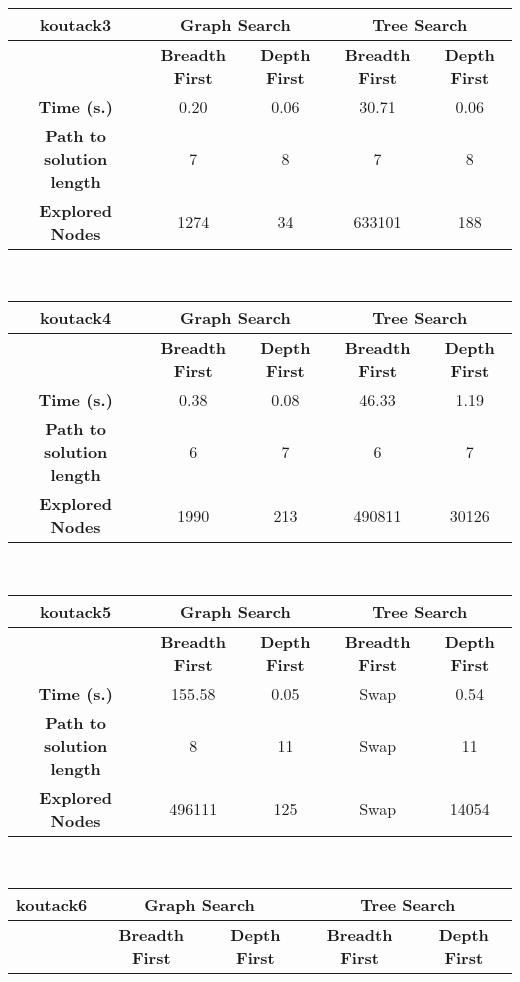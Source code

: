 \begin{description}
\begin{tabular}{|c|c|c|c|c|}
\hline 
\end{tabular}\\
\begin{tabular}{|c|c|c|c|c|} 
\hline \textbf{koutack3} & \multicolumn{2}{|c|}{\textbf{Graph Search}} & \multicolumn{2}{|c|}{\textbf{Tree Search}} \\ \hline & \textbf{Breadth First} &  \textbf{Depth First} & \textbf{Breadth First} &  \textbf{Depth First}\\ 
\hline \textbf{Time (s.)} & 0.20 & 0.06 & 30.71 & 0.06\\ \textbf{Path to solution length} & 7 & 8 & 7 & 8 \\ \textbf{Explored Nodes} & 1274 & 34 & 633101 & 188\\ 
\hline 
\end{tabular}\\
\begin{tabular}{|c|c|c|c|c|} 
\hline \textbf{koutack4} & \multicolumn{2}{|c|}{\textbf{Graph Search}} & \multicolumn{2}{|c|}{\textbf{Tree Search}} \\ \hline & \textbf{Breadth First} &  \textbf{Depth First} & \textbf{Breadth First} &  \textbf{Depth First}\\ 
\hline \textbf{Time (s.)} & 0.38 & 0.08 & 46.33 & 1.19\\ \textbf{Path to solution length} & 6 & 7 & 6 & 7 \\ \textbf{Explored Nodes} & 1990 & 213 & 490811 & 30126\\ 
\hline 
\end{tabular}\\
\begin{tabular}{|c|c|c|c|c|} 
\hline \textbf{koutack5} & \multicolumn{2}{|c|}{\textbf{Graph Search}} & \multicolumn{2}{|c|}{\textbf{Tree Search}} \\ \hline & \textbf{Breadth First} &  \textbf{Depth First} & \textbf{Breadth First} &  \textbf{Depth First}\\ 
\hline \textbf{Time (s.)} & 155.58 & 0.05  & Swap & 0.54\\ \textbf{Path to solution length} & 8 & 11  & Swap & 11 \\ \textbf{Explored Nodes} & 496111 & 125 & Swap & 14054\\ 
\hline 
\end{tabular}\\
\begin{tabular}{|c|c|c|c|c|} 
\hline \textbf{koutack6} & \multicolumn{2}{|c|}{\textbf{Graph Search}} & \multicolumn{2}{|c|}{\textbf{Tree Search}} \\ \hline & \textbf{Breadth First} &  \textbf{Depth First} & \textbf{Breadth First} &  \textbf{Depth First}\\ 

\end{tabular}
\end{description}
